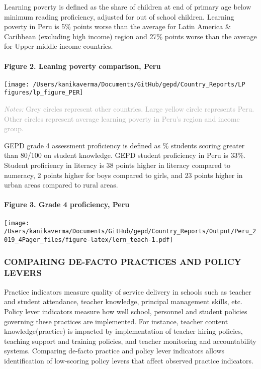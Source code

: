 \documentclass[twocolumn]{article}
\let\oldparagraph\paragraph
\renewcommand{\paragraph}[1]{\oldparagraph{#1}\mbox{}}
\begin{document}
Learning poverty is defined as the share of children at end of primary
age below minimum reading proficiency, adjusted for out of school
children. Learning poverty in Peru is 5\% points worse than the average
for Latin America \& Caribbean (excluding high income) region and 27\%
points worse than the average for Upper middle income countries.

\hypertarget{figure-2.-leaning-poverty-comparison-peru}{%
\paragraph{Figure 2. Leaning poverty comparison,
Peru}\label{figure-2.-leaning-poverty-comparison-peru}}

\texttt{[image: /Users/kanikaverma/Documents/GitHub/gepd/Country\_Reports/LP figures/lp\_figure\_PER]}

{\scriptsize
    \textcolor{darkgray}{\textit{Notes:} Grey circles represent other countries. Large yellow circle represents Peru. Other circles represent average learning poverty in Peru's region and income group.}
  }

GEPD grade 4 assessment proficiency is defined as \% students scoring
greater than 80/100 on student knowledge. GEPD student proficiency in
Peru is 33\%. Student proficiency in literacy is 38 points higher in
literacy compared to numeracy, 2 points higher for boys compared to
girls, and 23 points higher in urban areas compared to rural areas.

\hypertarget{figure-3.-grade-4-proficiency-peru}{%
\paragraph{Figure 3. Grade 4 proficiency,
Peru}\label{figure-3.-grade-4-proficiency-peru}}

\texttt{[image: /Users/kanikaverma/Documents/GitHub/gepd/Country\_Reports/Output/Peru\_2019\_4Pager\_files/figure-latex/lern\_teach-1.pdf]}

\hypertarget{comparing-de-facto-practices-and-policy-levers}{%
\subsubsection{\texorpdfstring{\textbf{COMPARING DE-FACTO PRACTICES AND
POLICY
LEVERS}}{COMPARING DE-FACTO PRACTICES AND POLICY LEVERS}}\label{comparing-de-facto-practices-and-policy-levers}}

Practice indicators measure quality of service delivery in schools such
as teacher and student attendance, teacher knowledge, principal
management skills, etc. Policy lever indicators measure how well school,
personnel and student policies governing these practices are
implemented. For instance, teacher content knowledge(practice) is
impacted by implementation of teacher hiring policies, teaching support
and training policies, and teacher monitoring and accountability
systems. Comparing de-facto practice and policy lever indicators allows
identification of low-scoring policy levers that affect observed
practice indicators.
\end{document}
